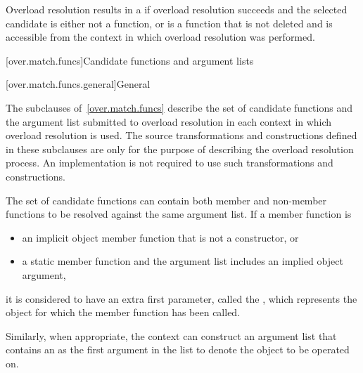 \pnum
Overload resolution results in a 
if overload resolution succeeds and
the selected candidate
is either not a function, or
is a function that is not deleted and
is accessible from the context
in which overload resolution was performed.

[over.match.funcs]{Candidate functions and argument lists}%

[over.match.funcs.general]{General}%
%

\pnum
The subclauses of~\ref{over.match.funcs} describe
the set of candidate functions and the argument list submitted to
overload resolution in each context in which
overload resolution is used.
The source transformations and constructions defined
in these subclauses are only for the purpose of describing the
overload resolution process.
An implementation is not required
to use such transformations and constructions.

\pnum
{}%
%
The set of candidate functions can contain both member and non-member
functions to be resolved against the same argument list.
If a member function is
\begin{itemize}
\item
an implicit object member function that is not a constructor, or
\item
a static member function and
the argument list includes an implied object argument,
\end{itemize}
it is considered to have an extra first parameter,
called the ,
which represents the object for which the member function has been called.

\pnum
Similarly, when appropriate, the context can construct an
argument list that contains an
as the first argument in the list to denote
the object to be operated on.

